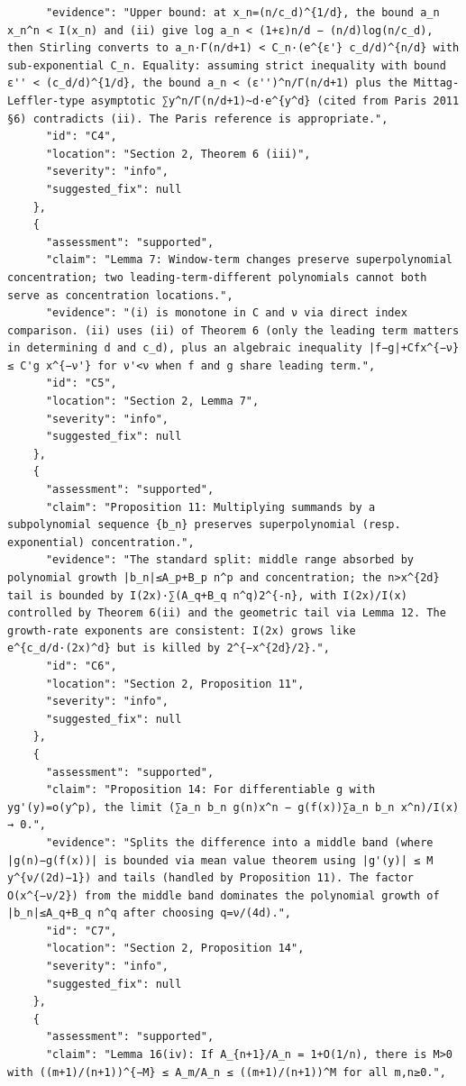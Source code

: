 \documentclass[11pt]{article}
\begin{document}
\begin{verbatim}
      "evidence": "Upper bound: at x_n=(n/c_d)^{1/d}, the bound a_n x_n^n < I(x_n) and (ii) give log a_n < (1+ε)n/d − (n/d)log(n/c_d), then Stirling converts to a_n·Γ(n/d+1) < C_n·(e^{ε'} c_d/d)^{n/d} with sub-exponential C_n. Equality: assuming strict inequality with bound ε'' < (c_d/d)^{1/d}, the bound a_n < (ε'')^n/Γ(n/d+1) plus the Mittag-Leffler-type asymptotic ∑y^n/Γ(n/d+1)~d·e^{y^d} (cited from Paris 2011 §6) contradicts (ii). The Paris reference is appropriate.",
      "id": "C4",
      "location": "Section 2, Theorem 6 (iii)",
      "severity": "info",
      "suggested_fix": null
    },
    {
      "assessment": "supported",
      "claim": "Lemma 7: Window-term changes preserve superpolynomial concentration; two leading-term-different polynomials cannot both serve as concentration locations.",
      "evidence": "(i) is monotone in C and ν via direct index comparison. (ii) uses (ii) of Theorem 6 (only the leading term matters in determining d and c_d), plus an algebraic inequality |f−g|+Cfx^{−ν} ≤ C'g x^{−ν'} for ν'<ν when f and g share leading term.",
      "id": "C5",
      "location": "Section 2, Lemma 7",
      "severity": "info",
      "suggested_fix": null
    },
    {
      "assessment": "supported",
      "claim": "Proposition 11: Multiplying summands by a subpolynomial sequence {b_n} preserves superpolynomial (resp. exponential) concentration.",
      "evidence": "The standard split: middle range absorbed by polynomial growth |b_n|≤A_p+B_p n^p and concentration; the n>x^{2d} tail is bounded by I(2x)·∑(A_q+B_q n^q)2^{-n}, with I(2x)/I(x) controlled by Theorem 6(ii) and the geometric tail via Lemma 12. The growth-rate exponents are consistent: I(2x) grows like e^{c_d/d·(2x)^d} but is killed by 2^{−x^{2d}/2}.",
      "id": "C6",
      "location": "Section 2, Proposition 11",
      "severity": "info",
      "suggested_fix": null
    },
    {
      "assessment": "supported",
      "claim": "Proposition 14: For differentiable g with yg'(y)=o(y^p), the limit (∑a_n b_n g(n)x^n − g(f(x))∑a_n b_n x^n)/I(x) → 0.",
      "evidence": "Splits the difference into a middle band (where |g(n)−g(f(x))| is bounded via mean value theorem using |g'(y)| ≤ M y^{ν/(2d)−1}) and tails (handled by Proposition 11). The factor O(x^{−ν/2}) from the middle band dominates the polynomial growth of |b_n|≤A_q+B_q n^q after choosing q=ν/(4d).",
      "id": "C7",
      "location": "Section 2, Proposition 14",
      "severity": "info",
      "suggested_fix": null
    },
    {
      "assessment": "supported",
      "claim": "Lemma 16(iv): If A_{n+1}/A_n = 1+O(1/n), there is M>0 with ((m+1)/(n+1))^{−M} ≤ A_m/A_n ≤ ((m+1)/(n+1))^M for all m,n≥0.",

\end{verbatim}
\end{document}
